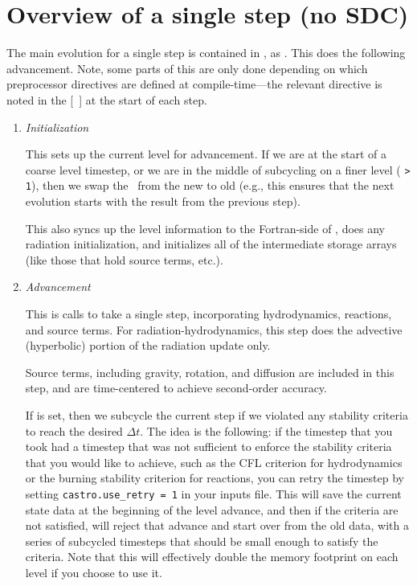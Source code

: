 
\section{Overview of a single step (no SDC)}

The main evolution for a single step is contained in
, as .  This does
the following advancement.  Note, some parts of this are only done
depending on which preprocessor directives are defined at
compile-time---the relevant directive is noted in the [\ ] at the start
of each step.

\begin{enumerate}
\item {\em Initialization} 

  This sets up the current level for advancement.  If we are at the
  start of a coarse level timestep, or we are in the middle of
  subcycling on a finer level ( {\tt > 1}), then
  we swap the \statedata\ from the new to old (e.g., this ensures that
  the next evolution starts with the result from the previous step).

  This also syncs up the level information to the Fortran-side of
  \castro, does any radiation initialization, and initializes all of
  the intermediate storage arrays (like those that hold source terms,
  etc.).

\item {\em Advancement} 

  This is calls  to take a single step,
  incorporating hydrodynamics, reactions, and source terms.  For
  radiation-hydrodynamics, this step does the advective (hyperbolic)
  portion of the radiation update only.

  Source terms, including gravity, rotation, and diffusion are
  included in this step, and are time-centered to achieve second-order
  accuracy.

  If  is set, then we subcycle the current
  step if we violated any stability criteria to reach the desired
  $\Delta t$.  The idea is the following: if the timestep that you
  took had a timestep that was not sufficient to enforce the stability
  criteria that you would like to achieve, such as the CFL criterion
  for hydrodynamics or the burning stability criterion for reactions,
  you can retry the timestep by setting {\tt castro.use\_retry = 1} in
  your inputs file. This will save the current state data at the
  beginning of the level advance, and then if the criteria are not
  satisfied, will reject that advance and start over from the old
  data, with a series of subcycled timesteps that should be small
  enough to satisfy the criteria.  Note that this will effectively
  double the memory footprint on each level if you choose to use it.



\end{enumerate}
